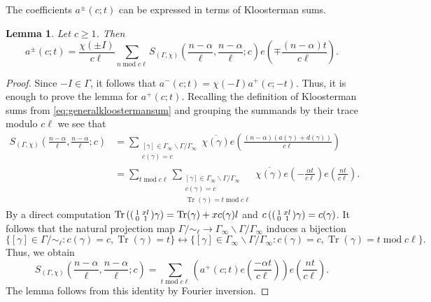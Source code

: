 \documentclass{article}
\newtheorem{lem}[thm]{Lemma}
\theoremstyle{named}
\DeclareMathOperator{\Tr}{Tr}
\DeclareMathOperator{\modulo}{mod}
\begin{document}
The coefficients $a^{\pm}(c; t)$ can be expressed in terms of Kloosterman sums.
\begin{lem}\label{lem:fourierinversoncoeff}
Let $c \geq 1$. Then 
\begin{equation}\label{eq:fourierinversoncoeff}
    a^{\pm}(c; t) = \frac{\chi(\pm I)}{c\ell}\sum_{n \modulo c\ell} S_{(\Gamma, \chi)}\left(\frac{n-\alpha}{\ell}, \frac{n-\alpha}{\ell}; c\right)e\left(\mp\frac{(n-\alpha)t}{c\ell}\right).
\end{equation}
\end{lem}
\begin{proof}
Since $- I \in \Gamma$, it follows that $a^{-}(c; t) = \chi(-I)a^+(c; -t)$. Thus, it is enough to prove the lemma for $a^+(c; t)$. 
Recalling the definition of Kloosterman sums from \eqref{eq:generalkloostermansum} and grouping the summands by their trace modulo $c\ell$ we see that 
\begin{equation*}
\begin{aligned}
    S_{(\Gamma, \chi)}\left(\frac{n-\alpha}{\ell}, \frac{n-\alpha}{\ell}; c\right) &  =\sum_{\substack{[\gamma] \in \Gamma_\infty \backslash \Gamma/\Gamma_\infty\\
        c(\gamma) = c}}\overline{\chi(\gamma)} e\left(\frac{(n-\alpha)(a(\gamma) + d(\gamma))}{c\ell}\right) \\
        & = \sum_{t \modulo c\ell}\sum_{\substack{[\gamma] \in \Gamma_\infty \backslash \Gamma/\Gamma_\infty\\
        c(\gamma) = c\\
        \Tr(\gamma) = t \modulo c\ell}}\overline{\chi(\gamma)}e\left(-\frac{\alpha t}{c\ell}\right)e\left(\frac{n t}{c\ell}\right).
\end{aligned}
\end{equation*}
By a direct computation $\Tr\left(\begin{psmallmatrix}
         1 & xl\\
        0 &  1
    \end{psmallmatrix}\gamma\right) = \Tr(\gamma) + xc(\gamma)l$ and $c\left(\begin{psmallmatrix}
         1 & xl\\
        0 &  1
    \end{psmallmatrix}\gamma\right) = c(\gamma)$. It follows that the natural projection map $\Gamma/\sim_\ell \rightarrow \Gamma_\infty\backslash \Gamma/\Gamma_\infty$ induces a bijection
\begin{equation*}
    \{[\gamma] \in \Gamma/\sim_\ell : c(\gamma) = c, \Tr(\gamma) = t\} \longleftrightarrow  \{[\gamma] \in \Gamma_\infty \backslash \Gamma /\Gamma_\infty : c(\gamma) = c, \Tr(\gamma) = t \modulo c\ell\}. 
\end{equation*} 
Thus, we obtain 
\begin{equation*}
    S_{(\Gamma, \chi)}\left(\frac{n-\alpha}{\ell}, \frac{n-\alpha}{\ell}; c\right) = \sum_{t \modulo c\ell } \left(a^+(c;t)e\left(\frac{-\alpha t}{c\ell}\right)\right)e\left(\frac{nt}{c\ell}\right).
\end{equation*}
The lemma follows from this identity by Fourier inversion.
\end{proof}
\end{document}

